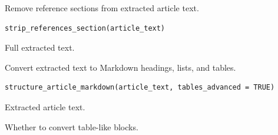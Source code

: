 \documentclass[a4paper]{book}
\begin{document}
%
\begin{Description}
Remove reference sections from extracted article text.
\end{Description}
%
\begin{Usage}
\begin{verbatim}
strip_references_section(article_text)
\end{verbatim}
\end{Usage}
%
\begin{Arguments}
\begin{ldescription}
\item[\code{article\_text}] Full extracted text.
\end{ldescription}
\end{Arguments}
%
\begin{Description}
Convert extracted text to Markdown headings, lists, and tables.
\end{Description}
%
\begin{Usage}
\begin{verbatim}
structure_article_markdown(article_text, tables_advanced = TRUE)
\end{verbatim}
\end{Usage}
%
\begin{Arguments}
\begin{ldescription}
\item[\code{article\_text}] Extracted article text.

\item[\code{tables\_advanced}] Whether to convert table-like blocks.
\end{ldescription}
\end{Arguments}
\printindex{}
\end{document}
